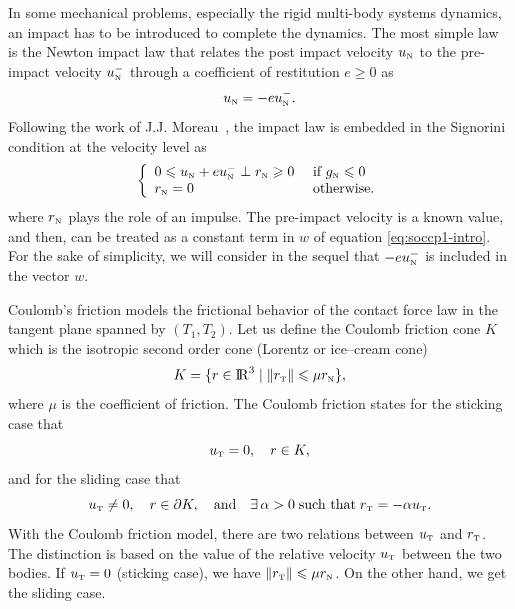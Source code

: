 {In some mechanical problems, especially the rigid multi-body systems dynamics, an impact has to be introduced to complete the dynamics. The most simple law is the Newton impact law that relates the post impact velocity $u_{{\hbox{\tiny{N}}}}$ to the pre-impact velocity $u_{{\hbox{\tiny{N}}}}^-$ through a coefficient of restitution $e \geq 0$ as
\begin{equation}
  \label{eq:newton-2}
  u_{\n} = -e u_{\n}^-.
\end{equation}
Following the work of J.J. Moreau~\cite{Moreau1988}, the impact law is embedded in the Signorini condition at the velocity level as
\begin{equation}
  \label{eq:signo-velocity-impact}
  \left\{\begin{array}{ll}
  0 \leq u_{\n}  + e u_{\n}^- \perp r_\n \geq 0  &\text{ if } g_{\n} \leq 0 \\
  r_{\n} =0 &\text{ otherwise}.
\end{array}\right.
\end{equation}
where $r_{\hbox{\tiny{N}}}$ plays the role of an impulse.
The pre-impact velocity is a known value, and then, can be  treated as a constant term  in $w$ of equation \eqref{eq:soccp1-intro}. For the sake of simplicity, we will consider  in the sequel that $-e u^-_{{\hbox{\tiny{N}}}}$ is included in the vector $w$.


Coulomb's friction  models the frictional behavior of the contact force law in the tangent plane { spanned by $(T_1,T_2)$}. Let us define the Coulomb friction  cone $K$ which is the isotropic second order cone (Lorentz or ice--cream cone)
\begin{equation}
  \label{eq:CoulombCone}
  K = \{r \in \RR^3 \mid \|r_\t\| \leq \mu r_\n\},
\end{equation}
where $\mu$ is the coefficient of friction. The Coulomb friction  states for the sticking case that 
\begin{equation}
  \label{eq:Coulom-stick}
  u_{\t} =0,\quad r \in K,
\end{equation}
and for the sliding case that
\begin{equation}
  \label{eq:Coulom-slide}
  u_{\t}  \neq 0,\quad r \in \partial K, \quad\text{and}\quad\exists\, \alpha > 0\;\text{such that}\; r_\t = -\alpha u_\t.
\end{equation}
With the Coulomb friction model, there are two relations between $u_{\hbox{\tiny{T}}}$ and $r_{\hbox{\tiny{T}}}$. The distinction is based on the value of the relative velocity $u_{\hbox{\tiny{T}}}$ between the two bodies. If $u_{\hbox{\tiny{T}}}=0$ (sticking case), we have $\|r_{\hbox{\tiny{T}}}\| \leqslant \mu r_{\hbox{\tiny{N}}}$. On the other hand, we get the sliding case.

}
